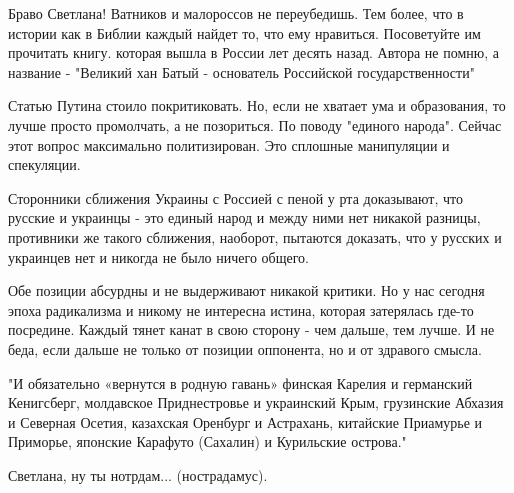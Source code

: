 \begin{itemize}
 

Браво Светлана! Ватников и малороссов не переубедишь. Тем более, что в истории
как в Библии каждый найдет то, что ему нравиться. Посоветуйте им прочитать
книгу. которая вышла в России лет десять назад. Автора не помню, а название -
"Великий хан Батый - основатель Российской государственности"

 

Статью Путина стоило покритиковать. Но, если не хватает ума и образования, то
лучше просто промолчать, а не позориться. По поводу "единого народа". Сейчас
этот вопрос максимально политизирован. Это сплошные манипуляции и спекуляции.

Сторонники сближения Украины с Россией с пеной у рта доказывают, что русские и
украинцы - это единый народ и между ними нет никакой разницы, противники же
такого сближения, наоборот, пытаются доказать, что у русских и украинцев нет и
никогда не было ничего общего. 

Обе позиции абсурдны и не выдерживают никакой критики. Но у нас сегодня эпоха
радикализма и никому не интересна истина, которая затерялась где-то посредине.
Каждый тянет канат в свою сторону - чем дальше, тем лучше. И не беда, если
дальше не только от позиции оппонента, но и от здравого смысла.


 

"И обязательно «вернутся в родную гавань» финская Карелия и германский
Кенигсберг, молдавское Приднестровье и украинский Крым, грузинские Абхазия и
Северная Осетия, казахская Оренбург и Астрахань, китайские Приамурье и
Приморье, японские Карафуто (Сахалин) и Курильские острова."

Светлана, ну ты нотрдам... (нострадамус).

 

\end{itemize}
